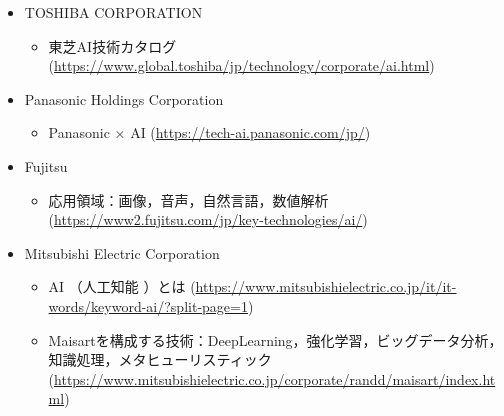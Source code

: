 \begin{itemize}
\begin{itemize}
\begin{itemize}
		\end{itemize}
		\item TOSHIBA CORPORATION
		\begin{itemize}
			\item 東芝AI技術カタログ (\url{https://www.global.toshiba/jp/technology/corporate/ai.html})
		\end{itemize}
		\item Panasonic Holdings Corporation
		\begin{itemize}
			\item Panasonic × AI (\url{https://tech-ai.panasonic.com/jp/})
		\end{itemize}
		\item Fujitsu
		\begin{itemize}
			\item 応用領域：画像，音声，自然言語，数値解析 (\url{https://www2.fujitsu.com/jp/key-technologies/ai/})
		\end{itemize}
		\item Mitsubishi Electric Corporation
		\begin{itemize}
			\item AI （人工知能 ）とは (\url{https://www.mitsubishielectric.co.jp/it/it-words/keyword-ai/?split-page=1})
			\item Maisartを構成する技術：DeepLearning，強化学習，ビッグデータ分析，知識処理，メタヒューリスティック (\url{https://www.mitsubishielectric.co.jp/corporate/randd/maisart/index.html})
		\end{itemize}
	\end{itemize}
\end{itemize}

